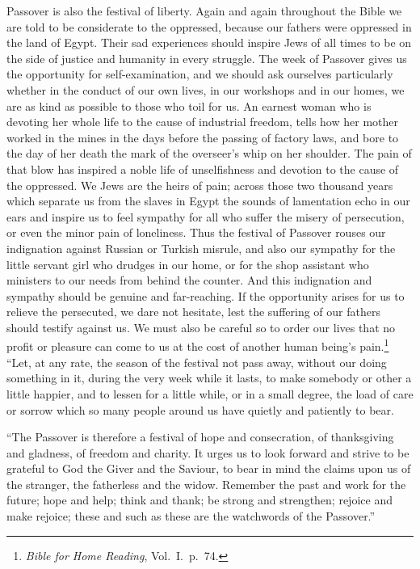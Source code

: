 Passover is also the festival of liberty.
Again and again throughout the Bible we
are told to be considerate to the oppressed,
because our fathers were oppressed in the
land of Egypt. Their sad experiences
should inspire Jews of all times to be on the
side of justice and humanity in every struggle.
The week of Passover gives us the opportunity
for self-examination, and we should
ask ourselves particularly whether in the
conduct of our own lives, in our workshops
and in our homes, we are as kind as possible
to those who toil for us. An earnest woman
who is devoting her whole life to the cause
of industrial freedom, tells how her mother
worked in the mines in the days before the
passing of factory laws, and bore to the day
of her death the mark of the overseer’s whip
on her shoulder. The pain of that blow has
inspired a noble life of unselfishness and
devotion to the cause of the oppressed. We
Jews are the heirs of pain; across those
two thousand years which separate us from
the slaves in Egypt the sounds of lamentation
echo in our ears and inspire us to feel
sympathy for all who suffer the misery of
persecution, or even the minor pain of loneliness.
Thus the festival of Passover rouses
our indignation against Russian or Turkish
misrule, and also our sympathy for the little
servant girl who drudges in our home, or
for the shop assistant who ministers to our
needs from behind the counter. And this
indignation and sympathy should be genuine
and far-reaching. If the opportunity arises
for us to relieve the persecuted, we dare
not hesitate, lest the suffering of our fathers
should testify against us. We must also be
careful so to order our lives that no profit
or pleasure can come to us at the cost of
another human being’s pain.\footnote{\textsl{Bible
for Home Reading}, Vol.\ I.\ p.\ 74.} “Let, at any
rate, the season of the festival not pass away,
without our doing something in it, during the
very week while it lasts, to make somebody
or other a little happier, and to lessen for
a little while, or in a small degree, the load
of care or sorrow which so many people
around us have quietly and patiently to
bear.

“The Passover is therefore a festival of
hope and consecration, of thanksgiving and
gladness, of freedom and charity. It urges
us to look forward and strive to be grateful
to God the Giver and the Saviour, to bear
in mind the claims upon us of the stranger,
the fatherless and the widow. Remember
the past and work for the future; hope and
help; think and thank; be strong and
strengthen; rejoice and make rejoice; these
and such as these are the watchwords of the
Passover.”

